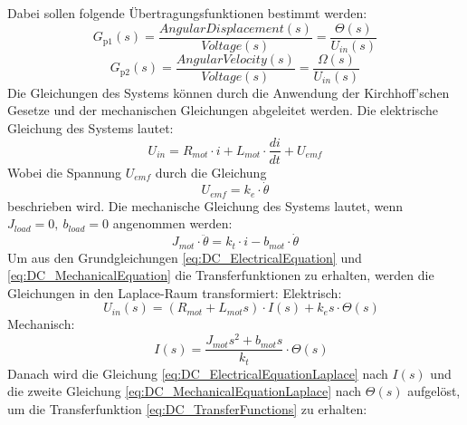 Dabei sollen folgende Übertragungsfunktionen bestimmt werden:
\begin{equation}
    \label{eq:DC_TransferFunctions}
    G_{\text{p1}}(s) = \frac{Angular Displacement(s)}{Voltage(s)} = \frac{\Theta(s)}{U_{in}(s)}
\end{equation}
\begin{equation}
    \label{eq:DC_TransferFunctions2}
    G_{\text{p2}}(s) = \frac{Angular Velocity(s)}{Voltage(s)} = \frac{\Omega(s)}{U_{in}(s)}
\end{equation}
\newline
Die Gleichungen des Systems können durch die Anwendung der Kirchhoff'schen Gesetze und der mechanischen Gleichungen abgeleitet werden.
Die elektrische Gleichung des Systems lautet:
\begin{equation}
    \label{eq:DC_ElectricalEquation}
    U_{in} = R_{mot} \cdot i + L_{mot} \cdot \frac{di}{dt} + U_{emf}
\end{equation}
\newline
Wobei die Spannung $U_{emf}$ durch die Gleichung
\begin{equation}
    \label{eq:DC_EMF}
    U_{emf} = k_e \cdot \dot{\theta}
\end{equation}
\newline
beschrieben wird. Die mechanische Gleichung des Systems lautet, wenn $J_{load}=0,\ b_{load}=0$ angenommen werden:
\begin{equation}
    \label{eq:DC_MechanicalEquation}
    J_{mot} \cdot \ddot{\theta} = k_t \cdot i - b_{mot} \cdot \dot{\theta}
\end{equation}
\newline
Um aus den Grundgleichungen \ref{eq:DC_ElectricalEquation} und \ref{eq:DC_MechanicalEquation} die Transferfunktionen zu erhalten, werden die Gleichungen in den Laplace-Raum transformiert:
\newline
Elektrisch: 
\begin{equation}
    \label{eq:DC_ElectricalEquationLaplace}
    \quad U_{in}(s) = (R_{mot} + L_{mot} s) \cdot I(s) + k_e s \cdot \Theta(s)
\end{equation}
Mechanisch: 
\begin{equation}
    \label{eq:DC_MechanicalEquationLaplace}
    \quad I(s) = \frac{J_{mot} s^2 + b_{mot} s}{k_t} \cdot \Theta(s)
\end{equation}
\newline
Danach wird die  Gleichung \ref{eq:DC_ElectricalEquationLaplace} nach $I(s)$ und die zweite Gleichung \ref{eq:DC_MechanicalEquationLaplace} nach $\Theta(s)$ aufgelöst, um die Transferfunktion \ref{eq:DC_TransferFunctions} zu erhalten:
